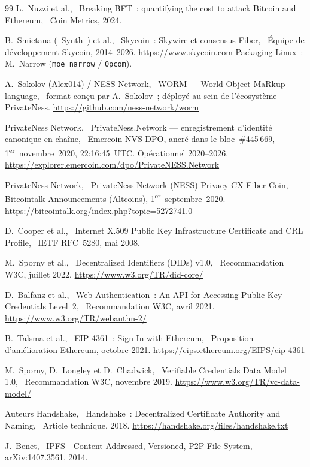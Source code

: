 \documentclass[11pt,a4paper]{article}
\begin{document}
\begin{thebibliography}{99}
  L.~Nuzzi et al.,
  \og~Breaking BFT~: quantifying the cost to attack Bitcoin and Ethereum,~\fg
  Coin Metrics, 2024.

  B.~Smietana (\og~Synth~\fg) et al.,
  \og~Skycoin~: Skywire et consensus Fiber,~\fg
  Équipe de développement Skycoin, 2014--2026.
  \url{https://www.skycoin.com}
  Packaging Linux~: M.~Narrow (\texttt{moe\_narrow} / \texttt{0pcom}).

  A.~Sokolov (Alex014) / NESS-Network,
  \og~WORM --- World Object MaRkup language,~\fg
  format conçu par A.~Sokolov~; déployé au sein de l'écosystème PrivateNess.
  \url{https://github.com/ness-network/worm}

  PrivateNess Network,
  \og~PrivateNess.Network --- enregistrement d'identité canonique en
  chaîne,~\fg
  Emercoin NVS DPO, ancré dans le bloc~\#445\,669,
  1\textsuperscript{er}~novembre~2020, 22:16:45~UTC.  Opérationnel
  2020--2026.
  \url{https://explorer.emercoin.com/dpo/PrivateNESS.Network}

  PrivateNess Network,
  \og~PrivateNess Network (NESS) Privacy CX Fiber Coin,~\fg
  Bitcointalk Announcements (Altcoins), 1\textsuperscript{er}~septembre~2020.
  \url{https://bitcointalk.org/index.php?topic=5272741.0}

  D.~Cooper et al.,
  \og~Internet X.509 Public Key Infrastructure Certificate and CRL Profile,~\fg
  IETF RFC~5280, mai 2008.

  M.~Sporny et al.,
  \og~Decentralized Identifiers (DIDs) v1.0,~\fg
  Recommandation W3C, juillet 2022.
  \url{https://www.w3.org/TR/did-core/}

  D.~Balfanz et al.,
  \og~Web Authentication~: An API for Accessing Public Key Credentials
  Level~2,~\fg
  Recommandation W3C, avril 2021.
  \url{https://www.w3.org/TR/webauthn-2/}

  B.~Talsma et al.,
  \og~EIP-4361~: Sign-In with Ethereum,~\fg
  Proposition d'amélioration Ethereum, octobre 2021.
  \url{https://eips.ethereum.org/EIPS/eip-4361}

  M.~Sporny, D.~Longley et D.~Chadwick,
  \og~Verifiable Credentials Data Model 1.0,~\fg
  Recommandation W3C, novembre 2019.
  \url{https://www.w3.org/TR/vc-data-model/}

  Auteurs Handshake,
  \og~Handshake~: Decentralized Certificate Authority and Naming,~\fg
  Article technique, 2018.
  \url{https://handshake.org/files/handshake.txt}

  J.~Benet,
  \og~IPFS---Content Addressed, Versioned, P2P File System,~\fg
  arXiv:1407.3561, 2014.

\end{thebibliography}
\end{document}
